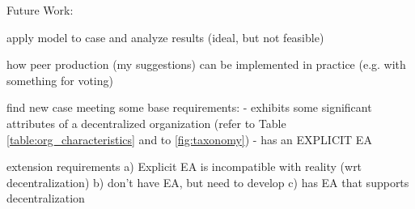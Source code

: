 Future Work:

apply model to case and analyze results (ideal, but not feasible)

how peer production (my suggestions) can be implemented in practice (e.g. with something for voting)

find new case meeting some base requirements:
 - exhibits some significant attributes of a decentralized organization (refer to Table \ref{table:org_characteristics} and to \ref{fig:taxonomy})
 - has an EXPLICIT EA

extension requirements
 a) Explicit EA is incompatible with reality (wrt decentralization)
 b) don't have EA, but need to develop
 c) has EA that supports decentralization